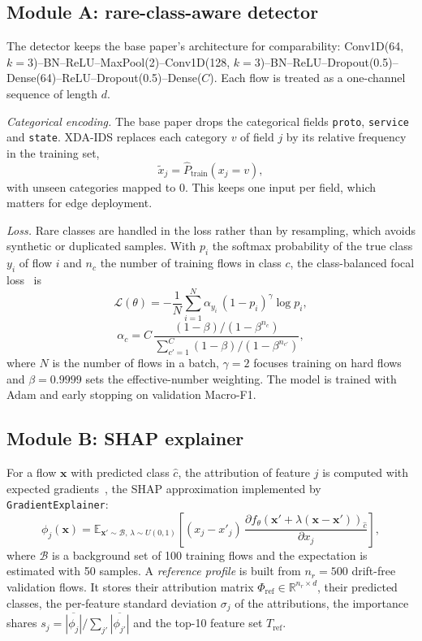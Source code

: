 \documentclass[pdflatex,sn-mathphys-num]{sn-jnl}%
\begin{document}
\subsection{Module A: rare-class-aware detector}
The detector keeps the base paper's architecture for comparability: Conv1D(64, $k{=}3$)--BN--ReLU--MaxPool(2)--Conv1D(128, $k{=}3$)--BN--ReLU--Dropout(0.5)--Dense(64)--ReLU--Dropout(0.5)--Dense($C$). Each flow is treated as a one-channel sequence of length $d$.

\textit{Categorical encoding.} The base paper drops the categorical fields \texttt{proto}, \texttt{service} and \texttt{state}. XDA-IDS replaces each category $v$ of field $j$ by its relative frequency in the training set,
\begin{equation}
\tilde{x}_j = \hat{P}_{\text{train}}(x_j = v),
\end{equation}
with unseen categories mapped to 0. This keeps one input per field, which matters for edge deployment.

\textit{Loss.} Rare classes are handled in the loss rather than by resampling, which avoids synthetic or duplicated samples. With $p_{i}$ the softmax probability of the true class $y_i$ of flow $i$ and $n_c$ the number of training flows in class $c$, the class-balanced focal loss~\cite{lin2017,cui2019} is
\begin{equation}
\mathcal{L}(\theta) = -\frac{1}{N}\sum_{i=1}^{N} \alpha_{y_i}\,(1-p_{i})^{\gamma}\log p_{i},
\end{equation}
\begin{equation}
\alpha_c = C\,\frac{(1-\beta)/(1-\beta^{n_c})}{\sum_{c'=1}^{C}(1-\beta)/(1-\beta^{n_{c'}})},
\end{equation}
where $N$ is the number of flows in a batch, $\gamma=2$ focuses training on hard flows and $\beta=0.9999$ sets the effective-number weighting. The model is trained with Adam and early stopping on validation Macro-F1.

\subsection{Module B: SHAP explainer}
For a flow $\mathbf{x}$ with predicted class $\hat{c}$, the attribution of feature $j$ is computed with expected gradients~\cite{erion2021}, the SHAP approximation implemented by \texttt{GradientExplainer}:
\begin{equation}
\phi_j(\mathbf{x}) = \mathbb{E}_{\mathbf{x}'\sim\mathcal{B},\,\lambda\sim U(0,1)}\!\left[(x_j-x'_j)\,\frac{\partial f_\theta(\mathbf{x}'+\lambda(\mathbf{x}-\mathbf{x}'))_{\hat{c}}}{\partial x_j}\right],
\end{equation}
where $\mathcal{B}$ is a background set of 100 training flows and the expectation is estimated with 50 samples. A \textit{reference profile} is built from $n_r=500$ drift-free validation flows. It stores their attribution matrix $\Phi_{\text{ref}}\in\mathbb{R}^{n_r\times d}$, their predicted classes, the per-feature standard deviation $\sigma_j$ of the attributions, the importance shares $s_j=\overline{|\phi_j|}/\sum_{j'}\overline{|\phi_{j'}|}$ and the top-10 feature set $T_{\text{ref}}$.
\end{document}

